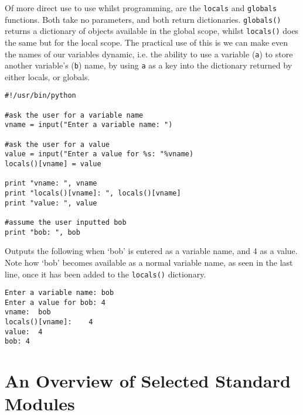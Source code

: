 Of more direct use to use whilst programming, are the \texttt{locals} and   \texttt{globals} functions. Both take no parameters, and both return   dictionaries. 
\texttt{globals()} returns a dictionary of objects   available in the global scope, whilst 
\texttt{locals()} does the   same but for the local scope. The practical use of this is we can make   even the names of our variables dynamic, i.e. the ability to use a   variable (\texttt{a}) to store another variable's (\texttt{b}) name, by using \texttt{a} as   a key into the dictionary returned by either locals, or globals.
\begin{lstlisting}
#!/usr/bin/python

#ask the user for a variable name
vname = input("Enter a variable name: ")

#ask the user for a value
value = input("Enter a value for %s: "%vname)
locals()[vname] = value

print "vname: ", vname
print "locals()[vname]: ", locals()[vname]
print "value: ", value

#assume the user inputted bob
print "bob: ", bob
\end{lstlisting}

Outputs the following when `bob' is entered as a variable name, and   4 as a value. Note how `bob' becomes available as a normal variable   name, as seen in the last line, once it has been added to the \texttt{locals()}   dictionary.
\begin{lstlisting}
Enter a variable name: bob
Enter a value for bob: 4
vname:	bob
locals()[vname]:	4
value:	4
bob: 4
\end{lstlisting}

\section{An Overview of Selected Standard Modules}

